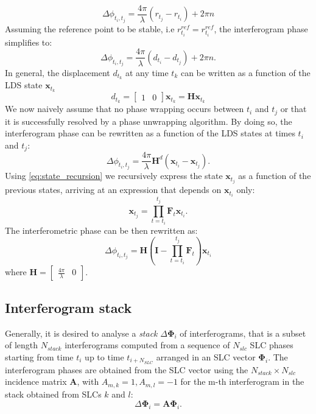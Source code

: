 \documentclass{article}
\begin{document}
\begin{equation}
	\Delta\phi_{t_i,t_j} =  \frac{4\pi}{\lambda} \left(r_{t_j} - r_{t_i}\right) + 2 \pi n
\end{equation}
Assuming the reference point to be stable, i.e $r_{t_i}^{ref} = r_{t_i}^{ref}$, the interferogram phase simplifies to:
\begin{equation}
	\Delta\phi_{t_i,t_j} =  \frac{4\pi}{\lambda} \left(d_{t_i} - d_{t_j}\right) + 2 \pi n.
\end{equation}
In general, the displacement $d_{t_k}$ at any time $t_k$ can be written as a function of the LDS state $\mathbf{x}_{t_k}$
\begin{equation}
	d_{t_k} = \begin{bmatrix}
		1 & 0
	\end{bmatrix} \mathbf{x}_{t_k} = \mathbf{H}  \mathbf{x}_{t_k}
\end{equation}
We now naively assume that no phase wrapping occurs between $t_{i}$ and $t_{j}$ or that it is successfully resolved by a phase unwrapping algorithm. By doing so, the interferogram phase can be rewritten as a function of the LDS states at times $t_{i}$ and $t_{j}$:
\begin{equation}\label{ifgram_phase}
	\Delta\phi_{t_i,t_j} = \frac{4\pi}{\lambda} \mathbf{H}^d \left( \mathbf{x}_{t_i} - \mathbf{x}_{t_j} \right).
\end{equation}		
Using \autoref{eq:state_recursion} we recursively express the state $\mathbf{x}_{t_j}$ as a function of the previous states, arriving at an expression that depends on $\mathbf{x}_{t_i}$ only:
\begin{equation}
	\mathbf{x}_{t_j} = \prod_{t=t_{i}}^{t_j}\mathbf{F}_t \mathbf{x}_{t_i}.
\end{equation}
The interferometric phase can be then rewritten as:
\begin{equation}
	\Delta\phi_{t_i,t_j} = \mathbf{H} \left(\mathbf{I} - \prod_{t=t_{i}}^{t_j}\mathbf{F}_t \right)\mathbf{x}_{t_i}
\end{equation}	
where $\mathbf{H} = 
	\begin{bmatrix}
	 \frac{4\pi}{\lambda} & 0
	\end{bmatrix}$.
\subsection{Interferogram stack}
Generally, it is desired to analyse a \emph{stack} $\Delta\mathbf{\Phi}_{i}$  of interferograms, that is a subset of length $N_{stack}$ interferograms computed from a sequence of $N_{slc}$ SLC phases starting from time $t_i$ up to time $t_{i+N_{SLC}}$ arranged in an SLC vector $\mathbf{\Phi}_i$. The interferogram phases  are obtained from the SLC vector using the  $N_{stack}\times N_{slc}$ incidence matrix $\mathbf{A}$, with $A_{m,k} = 1, A_{m,l}=-1$ for the m-th interferogram in the stack obtained from SLCs $k$ and $l$\cite{Agram2015}:
\begin{equation}
	 \Delta\mathbf{\Phi}_{i} = \mathbf{A} \mathbf{\Phi}_{i}.
\end{equation}
\end{document}
